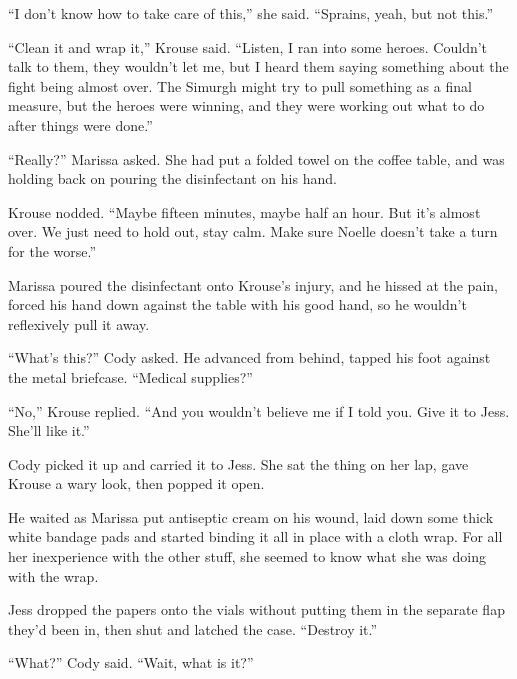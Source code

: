 ``I don't know how to take care of this,'' she said.  ``Sprains, yeah, but not this.''



``Clean it and wrap it,'' Krouse said.  ``Listen, I ran into some heroes.  Couldn't talk to them, they wouldn't let me, but I heard them saying something about the fight being almost over. The Simurgh might try to pull something as a final measure, but the heroes were winning, and they were working out what to do after things were done.''



``Really?'' Marissa asked.  She had put a folded towel on the coffee table, and was holding back on pouring the disinfectant on his hand.



Krouse nodded.  ``Maybe fifteen minutes, maybe half an hour.  But it's almost over.  We just need to hold out, stay calm.  Make sure Noelle doesn't take a turn for the worse.''



Marissa poured the disinfectant onto Krouse's injury, and he hissed at the pain, forced his hand down against the table with his good hand, so he wouldn't reflexively pull it away.



``What's this?'' Cody asked.  He advanced from behind, tapped his foot against the metal briefcase.  ``Medical supplies?''



``No,'' Krouse replied.  ``And you wouldn't believe me if I told you.  Give it to Jess.  She'll like it.''



Cody picked it up and carried it to Jess.  She sat the thing on her lap, gave Krouse a wary look, then popped it open.



He waited as Marissa put antiseptic cream on his wound, laid down some thick white bandage pads and started binding it all in place with a cloth wrap.  For all her inexperience with the other stuff, she seemed to know what she was doing with the wrap.



Jess dropped the papers onto the vials without putting them in the separate flap they'd been in, then shut and latched the case.  ``Destroy it.''



``What?''  Cody said.  ``Wait, what is it?''



